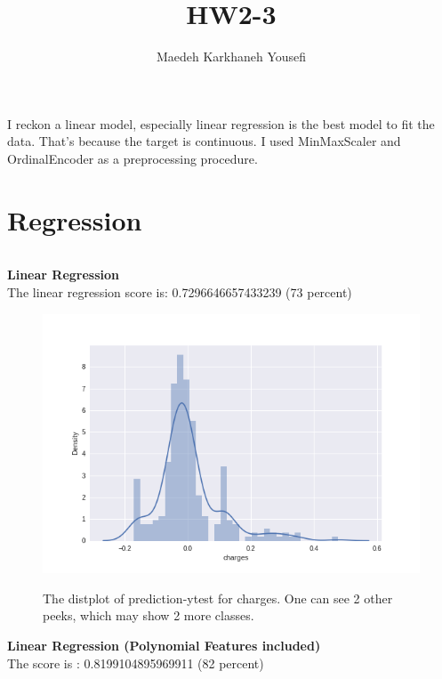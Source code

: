 \documentclass[12pt]{article}
\author{Maedeh Karkhaneh Yousefi}
\title{HW2-3}
\begin{document}
\maketitle
I reckon a linear model, especially linear regression is the best model to fit the data. That's because the target is continuous. 
I used MinMaxScaler and OrdinalEncoder as a preprocessing procedure.
\part{Regression}
\paragraph*{}
\textbf{Linear Regression}
\\ The linear regression score is: 0.7296646657433239 (73 percent)
\begin{figure}[H]
\centering
\includegraphics[width=\textwidth]{linearR (1).png}
\label{mesh:fig1}
\caption{The distplot of prediction-ytest for charges. One can see 2 other peeks, which may show 2 more classes.}
\end{figure}
\pagebreak
\textbf{Linear Regression (Polynomial Features included)}\\
The score is : 0.8199104895969911 (82 percent)
\end{document}

